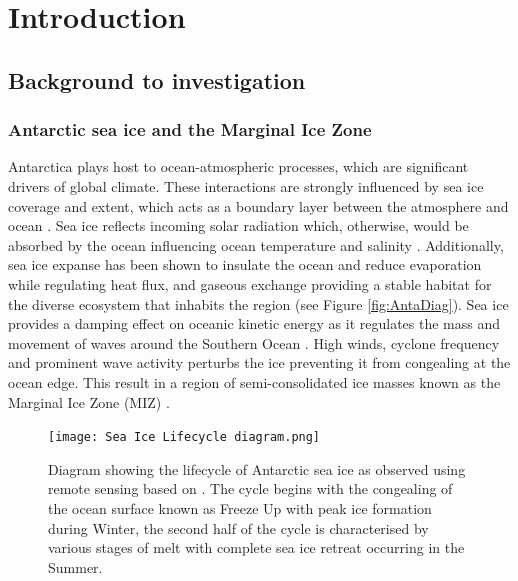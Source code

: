 \chapter{Introduction}
\label{ch:ch1}
\section{Background to investigation}
\label{sec:ch1.section1}

\subsection{Antarctic sea ice and the Marginal Ice Zone}
Antarctica plays host to ocean-atmospheric processes, which are significant drivers of global climate. These interactions are strongly influenced by sea ice coverage and extent, which acts as a boundary layer between the atmosphere and ocean \cite{parkinson2004southern}. Sea ice reflects incoming solar radiation which, otherwise, would be absorbed by the ocean influencing ocean temperature and salinity \cite{parkinson2004southern}. Additionally, sea ice expanse has been shown to insulate the ocean and reduce evaporation while regulating heat flux, and gaseous exchange \cite{deconto2003rapid} providing a stable habitat for the diverse ecosystem that inhabits the region \cite{arrigo2004large} (see Figure \ref{fig:AntaDiag}). Sea ice provides a damping effect on oceanic kinetic energy as it regulates the mass and movement of waves around the Southern Ocean \cite{parkinson2004southern,roach2020antarctic}. High winds, cyclone frequency and prominent wave activity perturbs the ice preventing it from congealing at the ocean edge. This result in a region of semi-consolidated ice masses known as the Marginal Ice Zone (MIZ) \cite{wadhams1987ice}.

\begin{figure}[H]
	\centering
	\texttt{[image: Sea Ice Lifecycle diagram.png]}
	\caption{Diagram showing the lifecycle of Antarctic sea ice as observed using remote sensing based on \textcite{barber2005microwave}. The cycle begins with the congealing of the ocean surface known as Freeze Up with peak ice formation during Winter, the second half of the cycle is characterised by various stages of melt with complete sea ice retreat occurring in the Summer.}
	\label{fig:ice_diag}
\end{figure}

